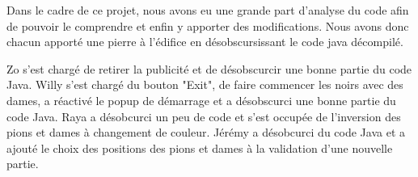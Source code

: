 
Dans le cadre de ce projet, nous avons eu une grande part d'analyse du code afin
de pouvoir le comprendre et enfin y apporter des modifications.
Nous avons donc chacun apporté une pierre à l'édifice en désobscursissant le code java décompilé.

Zo s'est chargé de retirer la publicité et de désobscurcir une bonne partie du code Java.
Willy s'est chargé du bouton "Exit", de faire commencer les noirs avec des dames,
a réactivé le popup de démarrage et a désobscurci une bonne partie du code Java.
Raya a désobcurci un peu de code et s'est occupée de l'inversion des pions et dames à changement de couleur.
Jérémy a désobcurci du code Java et a ajouté le choix des positions des pions et dames à la validation d'une nouvelle partie.


